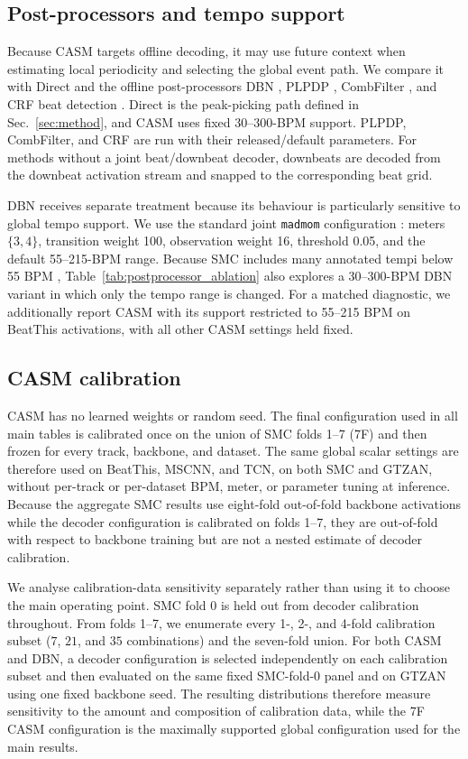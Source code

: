 \documentclass{article}
\begin{document}
\subsection{Post-processors and tempo support}
Because CASM targets offline decoding, it may use future context when estimating
local periodicity and selecting the global event path. We compare it with Direct
and the offline post-processors DBN \cite{krebs2015dbn}, PLPDP
\cite{chiu2023localperiodicity}, CombFilter \cite{bock2015combfilter}, and CRF
beat detection \cite{korzeniowski2014crf}. Direct is the peak-picking path defined
in Sec.~\ref{sec:method}, and CASM uses fixed 30--300-BPM support. PLPDP,
CombFilter, and CRF are run with their released/default parameters. For methods
without a joint beat/downbeat decoder, downbeats are decoded from the downbeat
activation stream and snapped to the corresponding beat grid.

DBN receives separate treatment because its behaviour is particularly sensitive to global tempo support. We use the standard joint \texttt{madmom} configuration \cite{krebs2015dbn}: meters $\{3,4\}$, transition weight 100, observation weight 16, threshold 0.05, and the default 55--215-BPM range. Because SMC includes many annotated tempi below 55 BPM \cite{ahn2026smcblindspot}, Table~\ref{tab:postprocessor_ablation} also explores a 30--300-BPM DBN variant in which only the tempo range is changed. For a matched diagnostic, we additionally report CASM with its support restricted to 55--215 BPM on BeatThis activations, with all other CASM settings held fixed.

\subsection{CASM calibration}
CASM has no learned weights or random seed. The final configuration used in all main tables is calibrated once on the union of SMC folds 1--7 (7F) and then frozen for every track, backbone, and dataset. The same global scalar settings are therefore used on BeatThis, MSCNN, and TCN, on both SMC and GTZAN, without per-track or per-dataset BPM, meter, or parameter tuning at inference. Because the aggregate SMC results use eight-fold out-of-fold backbone activations while the decoder configuration is calibrated on folds 1--7, they are out-of-fold with respect to backbone training but are not a nested estimate of decoder calibration.

We analyse calibration-data sensitivity separately rather than using it to choose the main operating point. SMC fold 0 is held out from decoder calibration throughout. From folds 1--7, we enumerate every 1-, 2-, and 4-fold calibration subset ($7$, $21$, and $35$ combinations) and the seven-fold union. For both CASM and DBN, a decoder configuration is selected independently on each calibration subset and then evaluated on the same fixed SMC-fold-0 panel and on GTZAN using one fixed backbone seed. The resulting distributions therefore measure sensitivity to the amount and composition of calibration data, while the 7F CASM configuration is the maximally supported global configuration used for the main results.
\end{document}
